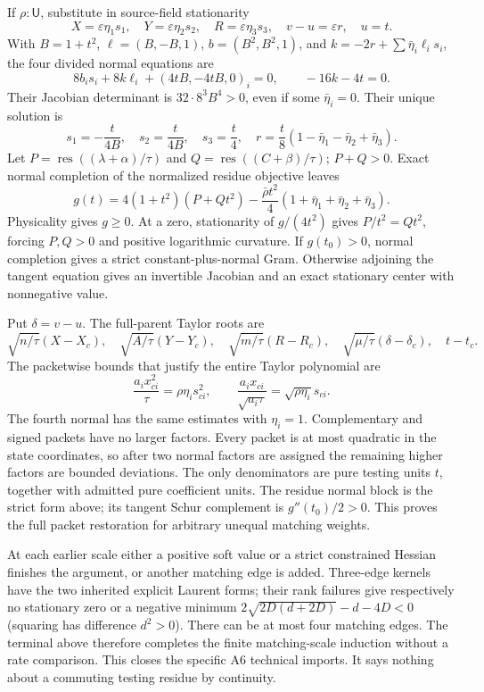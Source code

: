 \documentclass[11pt]{article}
\newcommand{\U}{\mathsf U}
\begin{document}
If $\rho:\U$, substitute in source-field stationarity
\[
X=\varepsilon\eta_1s_1,\quad Y=\varepsilon\eta_2s_2,
\quad R=\varepsilon\eta_3s_3,\quad v-u=\varepsilon r,\quad u=t.
\]
With $B=1+t^2$, $\ell=(B,-B,1)$, $b=(B^2,B^2,1)$, and
$k=-2r+\sum\bar\eta_i\ell_i s_i$, the four divided normal equations
are
\[
8b_i s_i+8k\ell_i+(4tB,-4tB,0)_i=0,\qquad -16k-4t=0.
\]
Their Jacobian determinant is $32\cdot8^3B^4>0$, even if some
$\bar\eta_i=0$. Their unique solution is
\[
s_1=-\frac{t}{4B},\quad s_2=\frac{t}{4B},\quad s_3=\frac t4,
\quad r=\frac t8(1-\bar\eta_1-\bar\eta_2+\bar\eta_3).
\]
Let $P=\operatorname{res}((\lambda+\alpha)/\tau)$ and
$Q=\operatorname{res}((C+\beta)/\tau)$; $P+Q>0$. Exact normal
completion of the normalized residue objective leaves
\[
g(t)=4(1+t^2)(P+Qt^2)
 -\frac{\bar\rho t^2}{4}(1+\bar\eta_1+\bar\eta_2+\bar\eta_3).
\]
Physicality gives $g\ge0$. At a zero, stationarity of $g/(4t^2)$
gives $P/t^2=Qt^2$, forcing $P,Q>0$ and positive logarithmic curvature.
If $g(t_0)>0$, normal completion gives a strict constant-plus-normal
Gram. Otherwise adjoining the tangent equation gives an invertible
Jacobian and an exact stationary center with nonnegative value.

Put $\delta=v-u$. The full-parent Taylor roots are
\[
\sqrt{n/\tau}(X-X_c),\quad\sqrt{A/\tau}(Y-Y_c),\quad
\sqrt{m/\tau}(R-R_c),\quad\sqrt{\mu/\tau}(\delta-\delta_c),
\quad t-t_c.
\]
The packetwise bounds that justify the entire Taylor polynomial are
\[
\frac{a_i x_{ci}^2}{\tau}=\rho\eta_i s_{ci}^2,\qquad
\frac{a_i x_{ci}}{\sqrt{a_i\tau}}=\sqrt{\rho\eta_i}s_{ci}.
\]
The fourth normal has the same estimates with $\eta_i=1$. Complementary
and signed packets have no larger factors. Every packet is at most
quadratic in the state coordinates, so after two normal factors are
assigned the remaining higher factors are bounded deviations. The only
denominators are pure testing units $t$, together with admitted pure
coefficient units. The residue normal block is the strict form above;
its tangent Schur complement is $g''(t_0)/2>0$. This proves the full
packet restoration for arbitrary unequal matching weights.

At each earlier scale either a positive soft value or a strict constrained
Hessian finishes the argument, or another matching edge is added.
Three-edge kernels have the two inherited explicit Laurent forms; their
rank failures give respectively no stationary zero or a negative minimum
$2\sqrt{2D(d+2D)}-d-4D<0$ (squaring has difference $d^2>0$).
There can be at most four matching edges. The terminal above therefore
completes the finite matching-scale induction without a rate comparison.
This closes the specific A6 technical imports. It says nothing about a
commuting testing residue by continuity.
\end{document}
